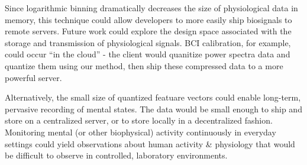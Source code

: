 Since logarithmic binning dramatically decreases the size of physiological data in memory, this technique could allow developers to more easily ship biosignals to remote servers. Future work could explore the design space associated with the storage and transmission of physiological signals. BCI calibration, for example, could occur “in the cloud” - the client would quanitize power spectra data and quantize them using our method, then ship these compressed data to a more powerful server. 

Alternatively, the small size of quantized featuare vectors could enable long-term, pervasive recording of mental states. The data would be small enough to ship and store on a centralized server, or to store locally in a decentralized fashion. Monitoring mental (or other biophysical) activity continuously in everyday settings could yield observations about human activity \& physiology that would be difficult to observe in controlled, laboratory environments.